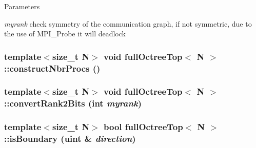 \begin{DoxyParams}{Parameters}
\item[{\em myrank}]check symmetry of the communication graph, if not symmetric, due to the use of MPI\_\-Probe it will deadlock \end{DoxyParams}
\hypertarget{classfullOctreeTop_a03cfaef9b474524b82dec9c77e07ef96}{
\subsubsection[{constructNbrProcs}]{\setlength{\rightskip}{0pt plus 5cm}template$<$size\_\-t N$>$ void {\bf fullOctreeTop}$<$ N $>$::constructNbrProcs ()}}
\label{classfullOctreeTop_a03cfaef9b474524b82dec9c77e07ef96}
\hypertarget{classfullOctreeTop_a2ac642778cc0a360e4077ace0498530c}{
\subsubsection[{convertRank2Bits}]{\setlength{\rightskip}{0pt plus 5cm}template$<$size\_\-t N$>$ void {\bf fullOctreeTop}$<$ N $>$::convertRank2Bits (int {\em myrank})}}
\label{classfullOctreeTop_a2ac642778cc0a360e4077ace0498530c}
\hypertarget{classfullOctreeTop_ac6953cc241ee8e048b4fc4867f9a21f1}{
\subsubsection[{isBoundary}]{\setlength{\rightskip}{0pt plus 5cm}template$<$size\_\-t N$>$ bool {\bf fullOctreeTop}$<$ N $>$::isBoundary (uint \& {\em direction})}}
\label{classfullOctreeTop_ac6953cc241ee8e048b4fc4867f9a21f1}


